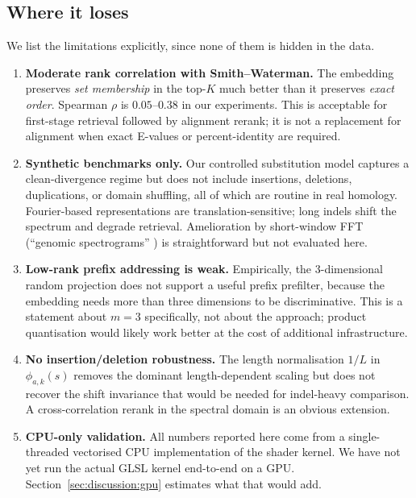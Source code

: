 \documentclass[twocolumn,11pt,a4paper]{article}
\theoremstyle{definition}
\theoremstyle{remark}
\begin{document}
\subsection{Where it loses}
\label{sec:discussion:limits}

We list the limitations explicitly, since none of them is hidden in the
data.

\begin{enumerate}
    \item \textbf{Moderate rank correlation with Smith--Waterman.} The
    embedding preserves \emph{set membership} in the top-$K$ much better
    than it preserves \emph{exact order}. Spearman $\rho$ is $0.05$--$0.38$
    in our experiments. This is acceptable for first-stage retrieval
    followed by alignment rerank; it is not a replacement for alignment
    when exact E-values or percent-identity are required.
    \item \textbf{Synthetic benchmarks only.} Our controlled substitution
    model captures a clean-divergence regime but does not include
    insertions, deletions, duplications, or domain shuffling, all of which
    are routine in real homology. Fourier-based representations are
    translation-sensitive; long indels shift the spectrum and degrade
    retrieval. Amelioration by short-window FFT (``genomic
    spectrograms'' \citep{voss1992}) is straightforward but not evaluated
    here.
    \item \textbf{Low-rank prefix addressing is weak.} Empirically, the
    $3$-dimensional random projection does not support a useful prefix
    prefilter, because the embedding needs more than three dimensions to
    be discriminative. This is a statement about $m = 3$ specifically, not
    about the approach; product quantisation
    \citep{malkov2020,johnson2021} would likely work better at the cost of
    additional infrastructure.
    \item \textbf{No insertion/deletion robustness.} The length
    normalisation $1/L$ in $\phi_{a,k}(s)$ removes the dominant
    length-dependent scaling but does not recover the shift invariance
    that would be needed for indel-heavy comparison. A cross-correlation
    rerank in the spectral domain is an obvious extension.
    \item \textbf{CPU-only validation.} All numbers reported here come from
    a single-threaded vectorised CPU implementation of the shader kernel.
    We have not yet run the actual GLSL kernel end-to-end on a GPU.
    Section~\ref{sec:discussion:gpu} estimates what that would add.
\end{enumerate}
\end{document}

